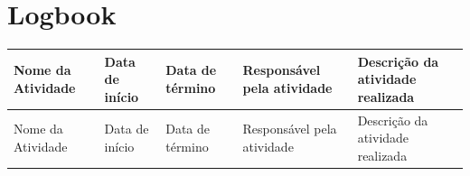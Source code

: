 \documentclass[
  a4paper,%
  12pt,%
  english,%
  brazilian,%
]{article}
\begin{document}
\section*{Logbook}

\begin{longtable}{|m{2.8cm}|m{2.4cm}|m{2.4cm}|m{2.4cm}|m{5cm}|} %
    \hline
    Nome da Atividade & Data de início & Data de término & Responsável pela atividade & Descrição da atividade realizada \\ \hline
    \endfirsthead
    \hline
    Nome da Atividade & Data de início & Data de término & Responsável pela atividade & Descrição da atividade realizada \\ \hline
    \endhead
    

\end{longtable}
\end{document}
